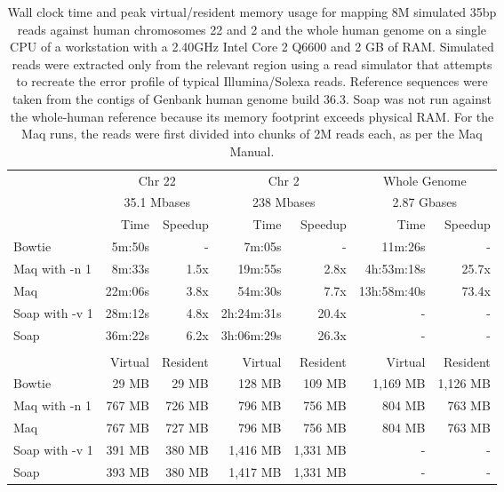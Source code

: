 \documentclass[letterpaper]{article}
\begin{document}
\begin{table}[tp]
\scriptsize
\begin{tabular}{lrrrrrr}
\toprule
 & \multicolumn{2}{c}{Chr 22} & \multicolumn{2}{c}{Chr 2} & \multicolumn{2}{c}{Whole Genome} \\[3pt] 
 & \multicolumn{2}{c}{35.1 Mbases} & \multicolumn{2}{c}{238 Mbases} & \multicolumn{2}{c}{2.87 Gbases} \\[3pt] 
 & Time & Speedup & Time & Speedup & Time & Speedup \\ 
\toprule
Bowtie & 5m:50s & - & 7m:05s & - & 11m:26s & -  \\ \midrule 
Maq with -n 1 & 8m:33s & 1.5x & 19m:55s & 2.8x & 4h:53m:18s & 25.7x  \\ \midrule 
Maq & 22m:06s & 3.8x & 54m:30s & 7.7x & 13h:58m:40s & 73.4x  \\ \midrule 
Soap with -v 1 & 28m:12s & 4.8x & 2h:24m:31s & 20.4x & - & -  \\ \midrule 
Soap & 36m:22s & 6.2x & 3h:06m:29s & 26.3x & - & -  \\[2pt] \bottomrule \\ 
 & Virtual & Resident & Virtual & Resident & Virtual & Resident \\ 
\toprule
Bowtie & 29 MB & 29 MB & 128 MB & 109 MB & 1,169 MB & 1,126 MB  \\ \midrule 
Maq with -n 1 & 767 MB & 726 MB & 796 MB & 756 MB & 804 MB & 763 MB  \\ \midrule 
Maq & 767 MB & 727 MB & 796 MB & 756 MB & 804 MB & 763 MB  \\ \midrule 
Soap with -v 1 & 391 MB & 380 MB & 1,416 MB & 1,331 MB & - & -  \\ \midrule 
Soap & 393 MB & 380 MB & 1,417 MB & 1,331 MB & - & -  \\ 
\bottomrule
\end{tabular}
\scriptsize\caption{Wall clock time and peak virtual/resident memory usage for mapping 8M simulated 35bp reads against human chromosomes 22 and 2 and the whole human genome on a single CPU of a workstation with a 2.40GHz Intel Core 2 Q6600 and 2 GB of RAM. Simulated reads were extracted only from the relevant region using a read simulator that attempts to recreate the error profile of typical Illumina/Solexa reads. Reference sequences were taken from the contigs of Genbank human genome build 36.3. Soap was not run against the whole-human reference because its memory footprint exceeds physical RAM. For the Maq runs, the reads were first divided into chunks of 2M reads each, as per the Maq Manual.}
\end{table}
\end{document}

